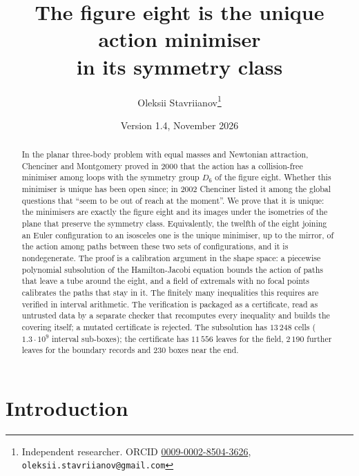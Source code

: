 \documentclass[11pt]{article}
\title{The figure eight is the unique action minimiser\\ in its symmetry class}
\author{Oleksii Stavriianov\thanks{Independent researcher. ORCID \href{https://orcid.org/0009-0002-8504-3626}{0009-0002-8504-3626}, \texttt{oleksii.stavriianov@gmail.com}}}
\date{Version 1.4, November 2026}
\theoremstyle{definition}
\begin{document}
\maketitle

\begin{abstract}
In the planar three-body problem with equal masses and Newtonian attraction, Chenciner and Montgomery proved in 2000
that the action has a collision-free minimiser among loops with the symmetry group $D_6$ of the figure eight. Whether
this minimiser is unique has been open since; in 2002 Chenciner listed it among the global questions that ``seem to be
out of reach at the moment''. We prove that it is unique: the minimisers are exactly the figure eight and its images
under the isometries of the plane that preserve the symmetry class. Equivalently, the twelfth of the eight joining an
Euler configuration to an isosceles one is the unique minimiser, up to the mirror, of the action among paths between
these two sets of configurations, and it is nondegenerate. The proof is a calibration argument in the shape space: a piecewise polynomial
subsolution of the Hamilton-Jacobi equation bounds the action of paths that leave a tube around the eight, and a field
of extremals with no focal points calibrates the paths that stay in it. The finitely many inequalities this requires
are verified in interval arithmetic. The verification is packaged as a certificate, read as untrusted data by a
separate checker that recomputes every inequality and builds the covering itself; a mutated certificate is rejected.
The subsolution has $13\,248$ cells ($1.3\cdot10^9$ interval sub-boxes); the certificate has $11\,556$ leaves for the
field, $2\,190$ further leaves for the boundary records and $230$ boxes near the end.
\end{abstract}

\section{Introduction}
\end{document}
